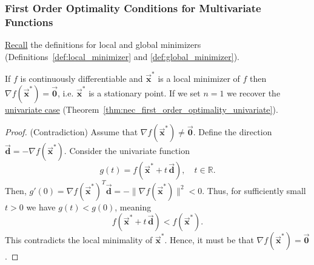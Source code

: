 \documentclass[9pt, headings=standardclasses, parskip=half]{scrartcl}
\renewcommand{\emph}[1]{\textcolor{mypurple}{#1}}
\newcommand{\vect}[1]{\vec{\boldsymbol{#1}}}
\begin{document}
\subsubsection{First Order Optimality Conditions for Multivariate Functions}
\hyperref[subsec:global_local_optimization]{Recall} the definitions for local and global minimizers (Definitions~\ref{def:local_minimizer} and \ref{def:global_minimizer}).

\begin{theorem}\label{thm:nec_first_order_optimality_multivariate}
If \(f\) is continuously differentiable and \(\vect{x}^{*}\) is a local minimizer of \(f\) then 
\(\nabla f(\vect{x}^{*})=\vect{0}\), i.e. \(\vect{x}^{*}\) is a \emph{stationary point}. If we set \(n=1\) we recover the \hyperref[thm:nec_first_order_optimality_univariate]{univariate case} (Theorem~\ref{thm:nec_first_order_optimality_univariate}).
\end{theorem}
\begin{proof}
(Contradiction)
Assume that \(\nabla f(\vect{x}^{*})\neq \vect{0}\). Define the direction
\(
\vect{d}=-\nabla f(\vect{x}^{*}).
\)
Consider the univariate function
\[
g(t)=f(\vect{x}^{*}+t\,\vect{d}),\quad t\in\mathbb{R}.
\]
Then,
\(
g'(0)=\nabla f(\vect{x}^{*})^{T}\vect{d}=-\|\nabla f(\vect{x}^{*})\|^{2}<0.
\)
Thus, for sufficiently small \(t>0\) we have \(g(t)<g(0)\), meaning
\[
f(\vect{x}^{*}+t\,\vect{d})<f(\vect{x}^{*}).
\]
This contradicts the local minimality of \(\vect{x}^{*}\). Hence, it must be that \(\nabla f(\vect{x}^{*})=\vect{0}\).
\end{proof}

\end{document}
